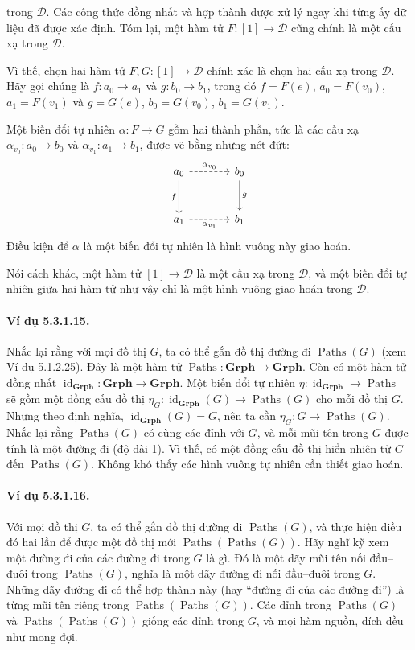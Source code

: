 trong $\mathcal D$. Các công thức đồng nhất và hợp thành được xử lý ngay khi từng ấy dữ liệu đã được xác định. Tóm lại, một hàm tử $F:[1]\to\mathcal D$ cũng chính là một cấu xạ trong $\mathcal D$.

Vì thế, chọn hai hàm tử $F,G:[1]\to\mathcal D$ chính xác là chọn hai cấu xạ trong $\mathcal D$. Hãy gọi chúng là $f:a_0\to a_1$ và $g:b_0\to b_1$, trong đó $f=F(e)$, $a_0=F(v_0)$, $a_1=F(v_1)$ và $g=G(e)$, $b_0=G(v_0)$, $b_1=G(v_1)$.

Một biến đổi tự nhiên $\alpha:F\to G$ gồm hai thành phần, tức là các cấu xạ $\alpha_{v_0}:a_0\to b_0$ và $\alpha_{v_1}:a_1\to b_1$, được vẽ bằng những nét đứt:
\[\begin{tikzcd}[column sep=large,row sep=large]
a_0\arrow[r,dashed,"\alpha_{v_0}"]\arrow[d,"f"']&b_0\arrow[d,"g"]\\a_1\arrow[r,dashed,"\alpha_{v_1}"']&b_1
\end{tikzcd}\]
Điều kiện để $\alpha$ là một biến đổi tự nhiên là hình vuông này giao hoán.

Nói cách khác, một hàm tử $[1]\to\mathcal D$ là một cấu xạ trong $\mathcal D$, và một biến đổi tự nhiên giữa hai hàm tử như vậy chỉ là một hình vuông giao hoán trong $\mathcal D$.
\paragraph{Ví dụ 5.3.1.15.} Nhắc lại rằng với mọi đồ thị $G$, ta có thể gắn đồ thị đường đi $\operatorname{Paths}(G)$ (xem Ví dụ 5.1.2.25). Đây là một hàm tử $\operatorname{Paths}:\mathbf{Grph}\to\mathbf{Grph}$. Còn có một hàm tử đồng nhất $\operatorname{id}_{\mathbf{Grph}}:\mathbf{Grph}\to\mathbf{Grph}$. Một biến đổi tự nhiên $\eta:\operatorname{id}_{\mathbf{Grph}}\to\operatorname{Paths}$ sẽ gồm một đồng cấu đồ thị $\eta_G:\operatorname{id}_{\mathbf{Grph}}(G)\to\operatorname{Paths}(G)$ cho mỗi đồ thị $G$. Nhưng theo định nghĩa, $\operatorname{id}_{\mathbf{Grph}}(G)=G$, nên ta cần $\eta_G:G\to\operatorname{Paths}(G)$. Nhắc lại rằng $\operatorname{Paths}(G)$ có cùng các đỉnh với $G$, và mỗi mũi tên trong $G$ được tính là một đường đi (độ dài 1). Vì thế, có một đồng cấu đồ thị hiển nhiên từ $G$ đến $\operatorname{Paths}(G)$. Không khó thấy các hình vuông tự nhiên cần thiết giao hoán.
\paragraph{Ví dụ 5.3.1.16.} Với mọi đồ thị $G$, ta có thể gắn đồ thị đường đi $\operatorname{Paths}(G)$, và thực hiện điều đó hai lần để được một đồ thị mới $\operatorname{Paths}(\operatorname{Paths}(G))$. Hãy nghĩ kỹ xem một đường đi của các đường đi trong $G$ là gì. Đó là một dãy mũi tên nối đầu--đuôi trong $\operatorname{Paths}(G)$, nghĩa là một dãy đường đi nối đầu--đuôi trong $G$. Những dãy đường đi có thể hợp thành này (hay ``đường đi của các đường đi'') là từng mũi tên riêng trong $\operatorname{Paths}(\operatorname{Paths}(G))$. Các đỉnh trong $\operatorname{Paths}(G)$ và $\operatorname{Paths}(\operatorname{Paths}(G))$ giống các đỉnh trong $G$, và mọi hàm nguồn, đích đều như mong đợi.

